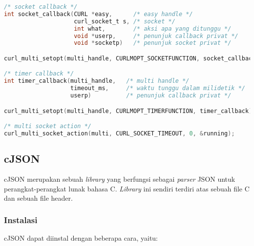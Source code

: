 \begin{lstlisting}[language=C, caption=Kumpulan implementasi pengunaan \textit{multi socket handle} curl, label=code:curl-usage-multisocket]
/* socket callback */
int socket_callback(CURL *easy,      /* easy handle */
                    curl_socket_t s, /* socket */
                    int what,        /* aksi apa yang ditunggu */
                    void *userp,     /* penunjuk callback privat */
                    void *socketp)   /* penunjuk socket privat */

curl_multi_setopt(multi_handle, CURLMOPT_SOCKETFUNCTION, socket_callback);

/* timer callback */
int timer_callback(multi_handle,   /* multi handle */
                   timeout_ms,     /* waktu tunggu dalam milidetik */
                   userp)          /* penunjuk callback privat */

curl_multi_setopt(multi_handle, CURLMOPT_TIMERFUNCTION, timer_callback);

/* multi socket action */
curl_multi_socket_action(multi, CURL_SOCKET_TIMEOUT, 0, &running);
\end{lstlisting}

\subsection{cJSON\protect\footnotemark}
\label{sec:cmodules-cJSON}

cJSON merupakan sebuah \textit{library} yang berfungsi sebagai \textit{parser} JSON untuk perangkat-perangkat lunak bahasa C. \textit{Library} ini sendiri terdiri atas sebuah file C dan sebuah file header.

\subsubsection{Instalasi}
\label{sec:cmodules-cJSON-instalation}

cJSON dapat diinstal dengan beberapa cara, yaitu:


